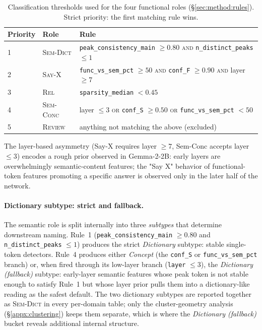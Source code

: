 \begin{table}[h]
\centering\small
\begin{tabular}{lll}
\toprule
Priority & Role & Rule \\
\midrule
1 & \textsc{Sem-Dict} & \texttt{peak\_consistency\_main} $\geq 0.80$ \textsc{and} \texttt{n\_distinct\_peaks} $\leq 1$ \\
2 & \textsc{Say-X}    & \texttt{func\_vs\_sem\_pct} $\geq 50$ \textsc{and} \texttt{conf\_F} $\geq 0.90$ \textsc{and} layer $\geq 7$ \\
3 & \textsc{Rel}      & \texttt{sparsity\_median} $< 0.45$ \\
4 & \textsc{Sem-Conc} & layer $\leq 3$ \textsc{or} \texttt{conf\_S} $\geq 0.50$ \textsc{or} \texttt{func\_vs\_sem\_pct} $< 50$ \\
5 & \textsc{Review}   & anything not matching the above (excluded) \\
\bottomrule
\end{tabular}
\caption{Classification thresholds used for the four functional roles (\S\ref{sec:method:rules}). Strict priority: the first matching rule wins.}
\label{tab:decision-thresholds}
\end{table}


The layer-based asymmetry (Say-X requires layer $\geq 7$, Sem-Conc accepts layer $\leq 3$) encodes a rough prior observed in Gemma-2-2B: early layers are overwhelmingly semantic-content features; the "Say X" behavior of functional-token features promoting a specific answer is observed only in the later half of the network.

\paragraph{Dictionary subtype: strict and fallback.}
The semantic role is split internally into three \emph{subtypes} that determine downstream naming. Rule~1 (\texttt{peak\_consistency\_main} $\geq 0.80$ and \texttt{n\_distinct\_peaks} $\leq 1$) produces the strict \emph{Dictionary} subtype: stable single-token detectors. Rule~4 produces either \emph{Concept} (the \texttt{conf\_S} or \texttt{func\_vs\_sem\_pct} branch) or, when fired through its low-layer branch (\texttt{layer} $\leq 3$), the \emph{Dictionary (fallback)} subtype: early-layer semantic features whose peak token is not stable enough to satisfy Rule~1 but whose layer prior pulls them into a dictionary-like reading as the safest default. The two dictionary subtypes are reported together as \textsc{Sem-Dict} in every per-domain table; only the cluster-geometry analysis (\S\ref{appx:clustering}) keeps them separate, which is where the \emph{Dictionary (fallback)} bucket reveals additional internal structure.


